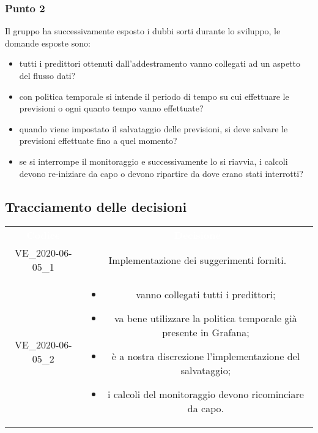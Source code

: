 \subsubsection{Punto 2}
Il gruppo ha successivamente esposto i dubbi sorti durante lo sviluppo, le domande esposte sono:
\begin{itemize}
\item tutti i predittori ottenuti dall'addestramento vanno collegati ad un aspetto del flusso dati?
\item con politica temporale si intende il periodo di tempo su cui effettuare le previsioni o ogni quanto tempo vanno effettuate?
\item quando viene impostato il salvataggio delle previsioni, si deve salvare le previsioni effettuate fino a quel momento?
\item se si interrompe il monitoraggio e successivamente lo si riavvia, i calcoli devono re-iniziare da capo o devono ripartire da dove erano stati interrotti?
\end{itemize}

\pagebreak
\subsection{Tracciamento delle decisioni}
\begin{longtable}{ c | c }
\rowcolor{redafk}
\textcolor{white}{\textbf{Codice}} & \textcolor{white}{\textbf{Decisione}}\\	
		VE\_2020-06-05\_1 & Implementazione dei suggerimenti forniti. \\
		VE\_2020-06-05\_2 & 
\begin{itemize}
\item vanno collegati tutti i predittori;
\item va bene utilizzare la politica temporale già presente in Grafana;
\item è a nostra discrezione l'implementazione del salvataggio;
\item i calcoli del monitoraggio devono ricominciare da capo.
\end{itemize}\\
\end{longtable}